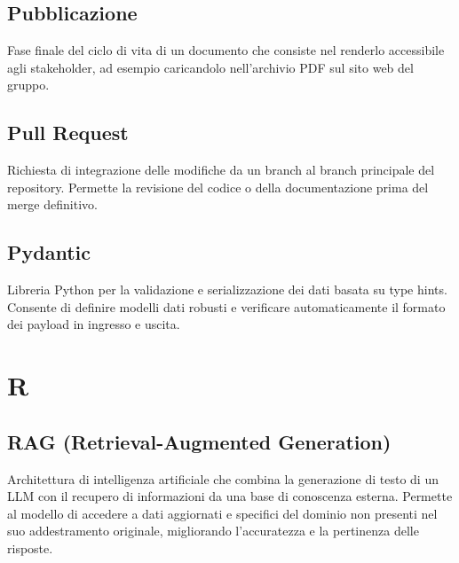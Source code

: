 \documentclass[a4paper, 11pt, oneside]{scrartcl} %
\begin{document}
\subsection*{Pubblicazione}


Fase finale del ciclo di vita di un documento che consiste nel renderlo accessibile agli stakeholder, ad esempio caricandolo nell'archivio PDF sul sito web del gruppo.

\vspace{0.5cm}

\subsection*{Pull Request}


Richiesta di integrazione delle modifiche da un branch al branch principale del repository. Permette la revisione del codice o della documentazione prima del merge definitivo.

\vspace{0.5cm}

\subsection*{Pydantic}
Libreria Python per la validazione e serializzazione dei dati basata su type hints. Consente di definire modelli dati robusti e verificare automaticamente il formato dei payload in ingresso e uscita.
\vspace{0.5cm}



\section*{R}


\subsection*{RAG (Retrieval-Augmented Generation)}
Architettura di intelligenza artificiale che combina la generazione di testo di un LLM con il recupero di informazioni da una base di conoscenza esterna. Permette al modello di accedere a dati aggiornati e specifici del dominio non presenti nel suo addestramento originale, migliorando l'accuratezza e la pertinenza delle risposte.
\vspace{0.5cm}
\end{document}
